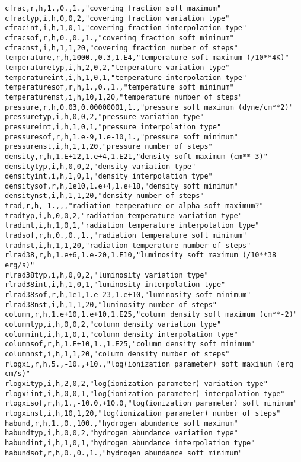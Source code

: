 \begin{verbatim}
cfrac,r,h,1.,0.,1.,"covering fraction soft maximum"
cfractyp,i,h,0,0,2,"covering fraction variation type"
cfracint,i,h,1,0,1,"covering fraction interpolation type"
cfracsof,r,h,0.,0.,1.,"covering fraction soft minimum"
cfracnst,i,h,1,1,20,"covering fraction number of steps"
temperature,r,h,1000.,0.3,1.E4,"temperature soft maximum (/10**4K)"
temperaturetyp,i,h,2,0,2,"temperature variation type"
temperatureint,i,h,1,0,1,"temperature interpolation type"
temperaturesof,r,h,1.,0.,1.,"temperature soft minimum"
temperaturenst,i,h,10,1,20,"temperature number of steps"
pressure,r,h,0.03,0.00000001,1.,"pressure soft maximum (dyne/cm**2)"
pressuretyp,i,h,0,0,2,"pressure variation type"
pressureint,i,h,1,0,1,"pressure interpolation type"
pressuresof,r,h,1.e-9,1.e-10,1.,"pressure soft minimum"
pressurenst,i,h,1,1,20,"pressure number of steps"
density,r,h,1.E+12,1.e+4,1.E21,"density soft maximum (cm**-3)"
densitytyp,i,h,0,0,2,"density variation type"
densityint,i,h,1,0,1,"density interpolation type"
densitysof,r,h,1e10,1.e+4,1.e+18,"density soft minimum"
densitynst,i,h,1,1,20,"density number of steps"
trad,r,h,-1.,,,"radiation temperature or alpha soft maximum?"
tradtyp,i,h,0,0,2,"radiation temperature variation type"
tradint,i,h,1,0,1,"radiation temperature interpolation type"
tradsof,r,h,0.,0.,1.,"radiation temperature soft minimum"
tradnst,i,h,1,1,20,"radiation temperature number of steps"
rlrad38,r,h,1.e+6,1.e-20,1.E10,"luminosity soft maximum (/10**38 erg/s)"
rlrad38typ,i,h,0,0,2,"luminosity variation type"
rlrad38int,i,h,1,0,1,"luminosity interpolation type"
rlrad38sof,r,h,1e1,1.e-23,1.e+10,"luminosity soft minimum"
rlrad38nst,i,h,1,1,20,"luminosity number of steps"
column,r,h,1.e+10,1.e+10,1.E25,"column density soft maximum (cm**-2)"
columntyp,i,h,0,0,2,"column density variation type"
columnint,i,h,1,0,1,"column density interpolation type"
columnsof,r,h,1.E+10,1.,1.E25,"column density soft minimum"
columnnst,i,h,1,1,20,"column density number of steps"
rlogxi,r,h,5.,-10.,+10.,"log(ionization parameter) soft maximum (erg cm/s)"
rlogxityp,i,h,2,0,2,"log(ionization parameter) variation type"
rlogxiint,i,h,0,0,1,"log(ionization parameter) interpolation type"
rlogxisof,r,h,1.,-10.0,+10.0,"log(ionization parameter) soft minimum"
rlogxinst,i,h,10,1,20,"log(ionization parameter) number of steps"
habund,r,h,1.,0.,100.,"hydrogen abundance soft maximum"
habundtyp,i,h,0,0,2,"hydrogen abundance variation type"
habundint,i,h,1,0,1,"hydrogen abundance interpolation type"
habundsof,r,h,0.,0.,1.,"hydrogen abundance soft minimum"

\end{verbatim}
